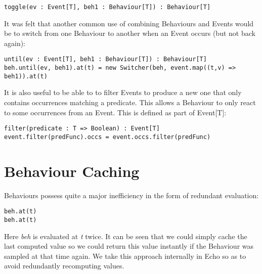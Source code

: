 \begin{verbatim}
toggle(ev : Event[T], beh1 : Behaviour[T]) : Behaviour[T]
\end{verbatim}        
    
    It was felt that another common use of combining Behaviours and Events would be
    to switch from one Behaviour to another when an Event occurs (but not back again):

\begin{verbatim}
until(ev : Event[T], beh1 : Behaviour[T]) : Behaviour[T]
beh.until(ev, beh1).at(t) = new Switcher(beh, event.map((t,v) => beh1)).at(t)
\end{verbatim}        
    
    It is also useful to be able to to filter Events to produce a new one that only
    contains occurrences matching a predicate. This allows a Behaviour to only react
    to some occurrences from an Event. This is defined as part of Event[T]:

\begin{verbatim}
filter(predicate : T => Boolean) : Event[T]
event.filter(predFunc).occs = event.occs.filter(predFunc)
\end{verbatim}  

  \section{Behaviour Caching}
    Behaviours possess quite a major inefficiency in the form of redundant evaluation:

\begin{verbatim}
beh.at(t)
beh.at(t)
\end{verbatim}  

    Here \emph{beh} is evaluated at \emph{t} twice. It can be seen that we could simply cache the last
    computed value so we could return this value instantly if the Behaviour was sampled at that time again.
    We take this approach internally in Echo so as to avoid redundantly recomputing values. 